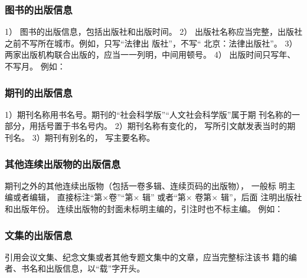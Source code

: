 \documentclass{article}
\begin{document}
\begin{quotation}

\end{quotation}

\subsubsection{图书的出版信息}

1） 图书的出版信息，包括出版社和出版时间。
2） 出版社名称应当完整，出版社之前不写所在城市。例如，只写“法律出
版社”，不写“ 北京：法律出版社”。
3） 两家出版机构联合出版的，应当一一列明，中间用顿号。 
4） 出版时间只写年、不写月。 例如：

\begin{quotation}
\end{quotation}


\subsubsection{期刊的出版信息}

1）期刊名称用书名号。期刊的“社会科学版”“人文社会科学版”属于期
刊名称的一部分，用括号置于书名号内。 
2）期刊名称有变化的， 写所引文献发表当时的期刊名。
3）期刊有别名的， 写主要名称。

\subsubsection{其他连续出版物的出版信息}
期刊之外的其他连续出版物（包括一卷多辑、连续页码的出版物）， 一般标
明主编或者编辑， 直接标注“第×卷”“第× 辑” 或者“第× 卷第× 辑”，后面
注明出版社和出版年份。 连续出版物的封面未标明主编的，引注时也不标主编。
例如：

\begin{quotation}

\end{quotation}


\subsubsection{文集的出版信息}
引用会议文集、纪念文集或者其他专题文集中的文章，应当完整标注该书
籍的编者、书名和出版信息，以“载”字开头。
\begin{quotation}
\end{quotation}
\end{document}
